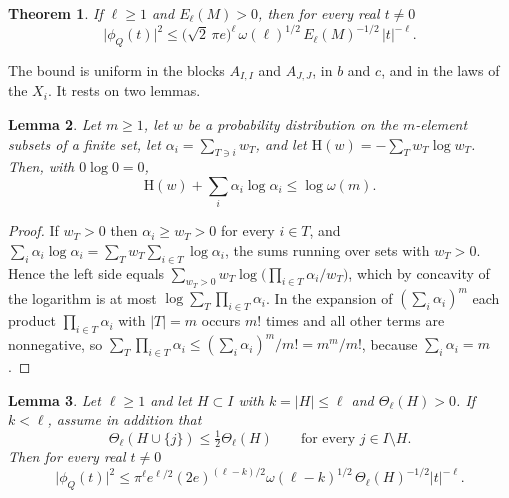 \documentclass[11pt]{amsart}
\numberwithin{equation}{section}
\newtheorem{theorem}{Theorem}[section]
\newtheorem{lemma}[theorem]{Lemma}
\theoremstyle{definition}
\theoremstyle{remark}
\newcommand{\1}{\mathbf 1}
\newcommand{\abs}[1]{\lvert #1\rvert}
\begin{document}
\begin{theorem}\label{thm:decay}
If $\ell\ge1$ and $E_\ell(M)>0$, then for every real $t\ne0$
\begin{equation}\label{eq:decay}
\abs{\phi_Q(t)}^2\le\bigl(\sqrt2\,\pi e\bigr)^{\ell}\,\omega(\ell)^{1/2}\,E_\ell(M)^{-1/2}\,\abs t^{-\ell}.
\end{equation}
\end{theorem}

The bound is uniform in the blocks $A_{I,I}$ and $A_{J,J}$, in $b$ and $c$, and in the laws of the $X_i$. It rests on two lemmas.

\begin{lemma}\label{lem:entropy}
Let $m\ge1$, let $w$ be a probability distribution on the $m$-element subsets of a finite set, let $\alpha_i=\sum_{T\ni i}w_T$, and let $\mathrm H(w)=-\sum_Tw_T\log w_T$. Then, with $0\log0=0$,
\[
\mathrm H(w)+\sum_i\alpha_i\log\alpha_i\le\log\omega(m).
\]
\end{lemma}

\begin{proof}
If $w_T>0$ then $\alpha_i\ge w_T>0$ for every $i\in T$, and $\sum_i\alpha_i\log\alpha_i=\sum_Tw_T\sum_{i\in T}\log\alpha_i$, the sums running over sets with $w_T>0$. Hence the left side equals $\sum_{w_T>0}w_T\log\bigl(\prod_{i\in T}\alpha_i/w_T\bigr)$, which by concavity of the logarithm is at most $\log\sum_T\prod_{i\in T}\alpha_i$. In the expansion of $(\sum_i\alpha_i)^m$ each product $\prod_{i\in T}\alpha_i$ with $\abs T=m$ occurs $m!$ times and all other terms are nonnegative, so $\sum_T\prod_{i\in T}\alpha_i\le(\sum_i\alpha_i)^m/m!=m^m/m!$, because $\sum_i\alpha_i=m$.
\end{proof}

\begin{lemma}\label{lem:hub}
Let $\ell\ge1$ and let $H\subset I$ with $k=\abs H\le\ell$ and $\Theta_\ell(H)>0$. If $k<\ell$, assume in addition that
\begin{equation}\label{eq:diffuse}
\Theta_\ell(H\cup\{j\})\le\tfrac12\Theta_\ell(H)\qquad\text{for every }j\in I\setminus H.
\end{equation}
Then for every real $t\ne0$
\begin{equation}\label{eq:hub}
\abs{\phi_Q(t)}^2\le\pi^\ell e^{\ell/2}(2e)^{(\ell-k)/2}\omega(\ell-k)^{1/2}\,\Theta_\ell(H)^{-1/2}\abs t^{-\ell}.
\end{equation}
\end{lemma}
\end{document}

